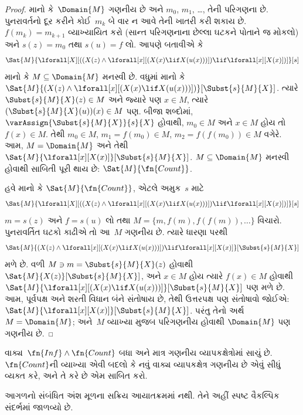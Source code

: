 \begin{proof}
માનો કે~$\Domain{M}$ ગણનીય છે અને $m_0$, $m_1$, \dots,
તેની પરિગણના છે. પુનરાવર્તનો દૂર કરીને કોઈ~$m_k$ બે વાર ન આવે તેની
ખાતરી કરી શકાય છે. $f(m_k) = m_{k+1}$ વ્યાખ્યાયિત કરો (સાન્ત
પરિગણનાના છેલ્લા ઘટકને પોતાને જ મોકલો) અને $s(z) = m_0$ તથા
$s(u) = f$ લો. આપણે બતાવીએ કે
\[
\Sat{M}{\lforall[X][((X(z) \land \lforall[x][(X(x) \lif X(u(x)))])
    \lif \lforall[x][X(x)])]}[s]
\]
માનો કે $M \subseteq \Domain{M}$ મનસ્વી છે. વધુમાં માનો કે
$\Sat{M}{(X(z) \land \lforall[x][(X(x) \lif
X(u(x)))])}[\Subst{s}{M}{X}]$. ત્યારે
$\Subst{s}{M}{X}(z) \in M$ અને જ્યારે પણ $x \in M$, ત્યારે
$(\Subst{s}{M}{X}(u))(x) \in M$ પણ. બીજા શબ્દોમાં,
$\varAssign{\Subst{s}{M}{X}}{s}{X}$ હોવાથી, $m_0 \in M$ અને
$x \in M$ હોય તો $f(x) \in M$. તેથી $m_0 \in M$,
$m_1 = f(m_0) \in M$, $m_2 = f(f(m_0)) \in M$ વગેરે. આમ,
$M = \Domain{M}$ અને તેથી
$\Sat{M}{\lforall[x][X(x)]}[\Subst{s}{M}{X}]$. $M \subseteq
\Domain{M}$ મનસ્વી હોવાથી સાબિતી પૂરી થાય છે:
$\Sat{M}{\fn{Count}}$.

હવે માનો કે $\Sat{M}{\fn{Count}}$, એટલે અમુક~$s$ માટે
\[
\Sat{M}{\lforall[X][((X(z) \land \lforall[x][(X(x) \lif X(u(x)))])
    \lif \lforall[x][X(x)])]}[s]
\]
$m = s(z)$ અને $f = s(u)$ લો તથા
$M = \{m,
f(m), f(f(m)), \dots\}$ વિચારો. પુનરાવર્તિત ઘટકો કાઢીએ તો
આ~$M$ ગણનીય છે. ત્યારે ધારણા પરથી
\[
\Sat{M}{(X(z) \land \lforall[x][(X(x) \lif X(u(x)))] )
    \lif \lforall[x][X(x)]}[\Subst{s}{M}{X}]
\]
મળે છે. વળી $M \ni m =
\Subst{s}{M}{X}(z)$ હોવાથી $\Sat{M}{X(z)}[\Subst{s}{M}{X}]$,
અને $x \in M$ હોય ત્યારે $f(x) \in
M$ હોવાથી $\Sat{M}{\lforall[x][(X(x) \lif
X(u(x)))]}[\Subst{s}{M}{X}]$ પણ મળે છે. આમ, પૂર્વપક્ષ અને
શરતી વિધાન બંને સંતોષાય છે, તેથી ઉત્તરપક્ષ પણ સંતોષાવો જોઈએ:
$\Sat{M}{\lforall[x][X(x)]}[\Subst{s}{M}{X}]$. પરંતુ તેનો અર્થ
$M = \Domain{M}$; અને~$M$ વ્યાખ્યા મુજબ પરિગણનીય હોવાથી
$\Domain{M}$ પણ ગણનીય છે.
\end{proof}

\begin{prob}
વાક્ય~$\fn{Inf} \land \fn{Count}$ બધા અને માત્ર
ગણનીય વ્યાપકક્ષેત્રોમાં સાચું છે. $\fn{Count}$ની વ્યાખ્યા
એવી બદલો કે નવું વાક્ય વ્યાપકક્ષેત્ર ગણનીય છે એવું
સીધું વ્યક્ત કરે, અને તે કરે છે એમ સાબિત કરો.
\end{prob}
\endgroup


\OLEndChapterHook


\begin{editorial}
આગળનો સંબંધિત અંશ મૂળના સક્રિય આયાતક્રમમાં નથી. તેને અહીં સ્પષ્ટ વૈકલ્પિક સંદર્ભમાં જાળવ્યો છે.
\end{editorial}
\begingroup
\makeatletter{}\makeatother

